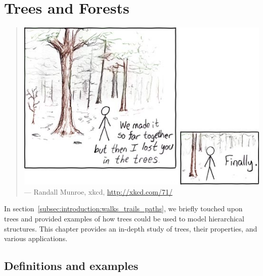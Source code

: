 
\chapter{Trees and Forests}
\label{chap:trees_forests}

\begin{quote}
\includegraphics[scale=3]{image/trees-forests/in-the-trees.png} \\
\noindent
--- Randall Munroe, xkcd,
\url{http://xkcd.com/71/}
\end{quote}

\noindent
In section~\ref{subsec:introduction:walks_trails_paths}, we briefly
touched upon trees and provided examples of how trees
could be used to model hierarchical
structures. This chapter provides an in-depth study of
trees, their properties, and various applications.



\section{Definitions and examples}

